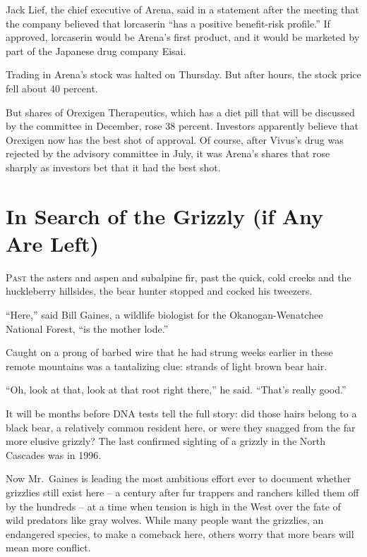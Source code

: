 ﻿\documentclass[12pt]{article}
\begin{document}
Jack Lief, the chief executive of Arena, said in a statement after the meeting that the company
believed that lorcaserin ``has a positive benefit-risk profile.'' If approved, lorcaserin would be
Arena's first product, and it would be marketed by part of the Japanese drug company Eisai.

Trading in Arena's stock was halted on Thursday. But after hours, the stock price fell about 40
percent.

But shares of Orexigen Therapeutics, which has a diet pill that will be discussed by the committee
in December, rose 38 percent. Investors apparently believe that Orexigen now has the best shot of
approval. Of course, after Vivus's drug was rejected by the advisory committee in July, it was
Arena's shares that rose sharply as investors bet that it had the best shot.

\pagebreak
\section{In Search of the Grizzly (if Any Are Left)}

\lettrine{P}{ast} the asters and aspen and subalpine fir, past the quick,
cold creeks and the huckleberry hillsides, the bear hunter stopped and cocked his tweezers.

``Here,'' said Bill Gaines, a wildlife biologist for the Okanogan-Wenatchee National Forest, ``is
the mother lode.''

Caught on a prong of barbed wire that he had strung weeks earlier in these remote mountains was a
tantalizing clue: strands of light brown bear hair.

``Oh, look at that, look at that root right there,'' he said. ``That's really good.''

It will be months before DNA tests tell the full story: did those hairs belong to a black bear, a
relatively common resident here, or were they snagged from the far more elusive grizzly? The last
confirmed sighting of a grizzly in the North Cascades was in 1996.

Now Mr.~Gaines is leading the most ambitious effort ever to document whether grizzlies still exist
here -- a century after fur trappers and ranchers killed them off by the hundreds -- at a time when
tension is high in the West over the fate of wild predators like gray wolves. While many people want
the grizzlies, an endangered species, to make a comeback here, others worry that more bears will
mean more conflict.
\end{document}
